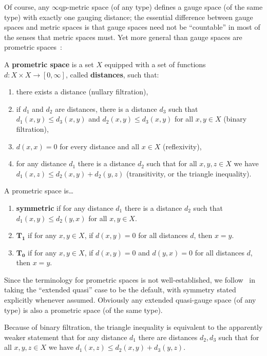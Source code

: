 \documentclass{article}
\def\Rp{[0,\infty]}
\def\eqp{$\infty$qp}
\begin{document}
Of course, any \eqp-metric space (of any type) defines a gauge space (of the same type) with exactly one gauging distance; the essential difference between gauge spaces and metric spaces is that gauge spaces need not be ``countable'' in most of the senses that metric spaces must.
Yet more general than gauge spaces are prometric spaces~\cite{cht:one-setting}:

\begin{defn}
  A \textbf{prometric space} is a set $X$ equipped with a set of functions $d:X\times X\to\Rp$, called \textbf{distances}, such that:
  \begin{enumerate}
  \item there exists a distance (nullary filtration),
  \item if $d_1$ and $d_2$ are distances, there is a distance $d_3$ such that $d_1(x,y)\le d_3(x,y)$ and $d_2(x,y)\le d_3(x,y)$ for all $x,y\in X$ (binary filtration),
  \item $d(x,x)=0$ for every distance and all $x\in X$ (reflexivity),
  \item for any distance $d_1$ there is a distance $d_2$ such that for all $x,y,z\in X$ we have $d_1(x,z)\le d_2(x,y)+d_2(y,z)$ (transitivity, or the triangle inequality).
  \end{enumerate}
  A prometric space is\dots
  \begin{enumerate}[resume]
  \item \textbf{symmetric} if for any distance $d_1$ there is a distance $d_2$ such that $d_1(x,y)\le d_2(y,x)$ for all $x,y\in X$.
  \item $\mathbf{T_1}$ if for any $x,y\in X$, if $d(x,y)=0$ for all distances $d$, then $x=y$.
  \item $\mathbf{T_0}$ if for any $x,y\in X$, if $d(x,y)=0$ and $d(y,x)=0$ for all distances $d$, then $x=y$.
  \end{enumerate}
\end{defn}

Since the terminology for prometric spaces is not well-established, we follow~\cite{cht:one-setting} in taking the ``extended quasi'' case to be the default, with symmetry stated explicitly whenever assumed.
Obviously any extended quasi-gauge space (of any type) is also a prometric space (of the same type).

\begin{rmk}
  Because of binary filtration, the triangle inequality is equivalent to the apparently weaker statement that for any distance $d_1$ there are distances $d_2,d_3$ such that for all $x,y,z\in X$ we have $d_1(x,z)\le d_2(x,y)+d_3(y,z)$.
\end{rmk}
\end{document}
